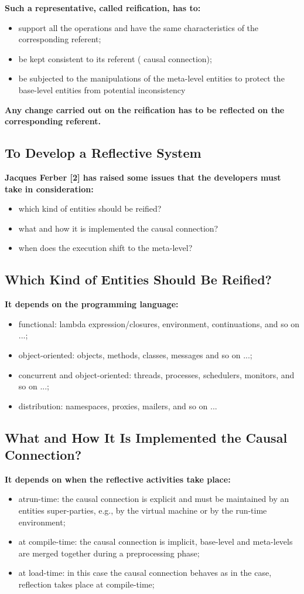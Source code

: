 \textbf{Such a representative, called reification, has to:}
\begin{itemize}
	\item support all the operations and have the same characteristics of the corresponding referent;
	\item be kept consistent to its referent ( causal connection);
	\item be subjected to the manipulations of the meta-level entities to protect the base-level entities from potential inconsistency
\end{itemize}

\textbf{Any change carried out on the reification has to be reflected on the corresponding referent.}

\subsection{To Develop a Reflective System}
\textbf{Jacques Ferber [2] has raised some issues that the developers must take in consideration:}
\begin{itemize}
	\item which kind of entities should be reified?
	\item what and how it is implemented the causal connection?
	\item when does the execution shift to the meta-level?
\end{itemize}

\subsection{Which Kind of Entities Should Be Reified?}
\textbf{It depends on the programming language:}
\begin{itemize}
	\item functional: lambda expression/closures, environment, continuations, and so on ...;
	\item object-oriented: objects, methods, classes, messages and so on ...;
	\item concurrent and object-oriented: threads, processes, schedulers, monitors, and so on ...;
	\item distribution: namespaces, proxies, mailers, and so on ...
\end{itemize}

\subsection{What and How It Is Implemented the Causal Connection?}
\textbf{It depends on when the reflective activities take place:}
\begin{itemize}
	\item atrun-time: the causal connection is explicit and must be maintained by an entities super-parties, e.g., by the virtual machine or by the run-time environment;
	\item at compile-time: the causal connection is implicit, base-level and meta-levels are merged together during a preprocessing phase;
	\item at load-time: in this case the causal connection behaves as in the case, reflection takes place at compile-time;
\end{itemize}

